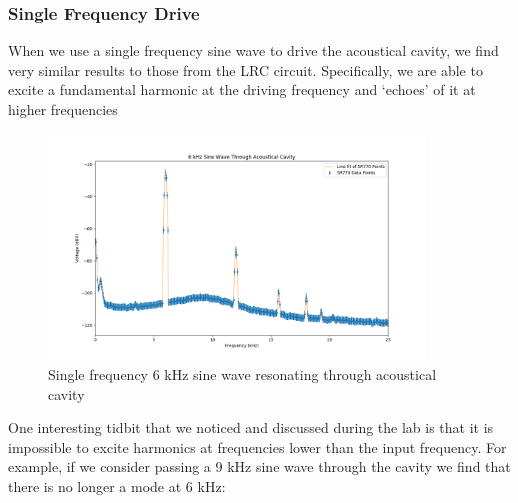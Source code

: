 \documentclass{article}
\begin{document}
\subsubsection{Single Frequency Drive}%
\label{ssub:single_frequency_drive}

When we use a single frequency sine wave to drive the acoustical cavity, we
find very similar results to those from the LRC circuit. Specifically, we are
able to excite a fundamental harmonic at the driving frequency and `echoes' of
it at higher frequencies

\begin{figure}[H]
    \centering
\begin{minipage}{11cm}
\begin{tcolorbox}
    \centering
        \includegraphics[width=10cm, height=6cm]{figures/figure28.png}
        \caption{Single frequency 6 kHz sine wave resonating through acoustical
        cavity}
        \label{fig:fig28}
\end{tcolorbox}
\end{minipage}
\end{figure}

One interesting tidbit that we noticed and discussed during the lab is that it
is impossible to excite harmonics at frequencies lower than the input
frequency. For example, if we consider passing a 9 kHz sine wave through the
cavity we find that there is no longer a mode at 6 kHz:
\end{document}
